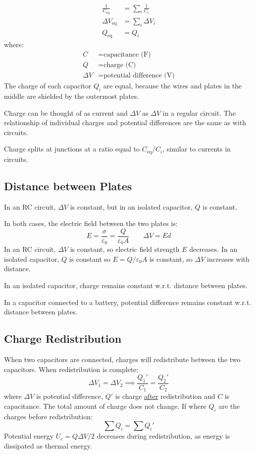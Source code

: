 \documentclass{article}
\newcommand{\theorem}[2]{\begin{tcolorbox}[title={#1},colback=blue!5!white,colframe=blue!75!black,parbox=false] #2 \end{tcolorbox}}
\newcommand{\remark}[2]{\begin{tcolorbox}[title={#1},colback=black!5!white,colframe=black!75!black,parbox=false] #2 \end{tcolorbox}}
\begin{document}
\theorem{Capacitors in series}{
	\begin{align*}
		\frac{1}{C_\text{eq}}
		&=\sum_i \frac1{C_i} \\
		\Delta V_\text{eq}
		&=\sum_i \Delta V_i \\
		Q_\text{eq}
		&=Q_i
	\end{align*}
	where:
	\begin{align*}
		C
		&=\text{capacitance (F)} \\
		Q
		&=\text{charge (C)} \\
		\Delta V
		&=\text{potential difference (V)}
	\end{align*}
	The charge of each capacitor $Q_i$ are equal, because the wires and plates in the middle are shielded by the outermost plates.
}

\remark*{
	Charge can be thought of as current and $\Delta V$ as $\Delta V$ in a regular circuit. The relationship of individual charges and potential differences are the same as with circuits.

	Charge splits at junctions at a ratio equal to $C_\text{eq}/C_i$, similar to currents in circuits.
}

\subsection{Distance between Plates}

In an RC circuit, $\Delta V$ is constant, but in an isolated capacitor, $Q$ is constant.

In both cases, the electric field between the two plates is:
\begin{equation*}
    E
	=\frac{\sigma}{\varepsilon_0}
	=\frac{Q}{\varepsilon_0A}
	\qquad
	\Delta V=Ed
\end{equation*}
In an RC circuit, $\Delta V$ is constant, so electric field strength $E$ decreases. In an isolated capacitor, $Q$ is constant so $E=Q/\varepsilon_0A$ is constant, so $\Delta V$ increases with distance.

\theorem*{
	In an isolated capacitor, charge remains constant w.r.t. distance between plates.

	In a capacitor connected to a battery, potential difference remains constant w.r.t. distance between plates.
}

\subsection{Charge Redistribution}

When two capacitors are connected, charges will redistribute between the two capacitors. When redistribution is complete:
\begin{equation*}
    \Delta V_1=\Delta V_2
	\implies \frac{Q_1'}{C_1}=\frac{Q_2'}{C_2}
\end{equation*}
where $\Delta V$ is potential difference, $Q'$ is charge \ul{after} redistribution and $C$ is capacitance. The total amount of charge does not change. If where $Q_i$ are the charges before redistribution:
\begin{equation*}
    \sum Q_i=\sum Q_i'
\end{equation*}
Potential energy $U_c=Q\Delta V/2$ decreases during redistribution, as energy is dissipated as thermal energy.
\end{document}
